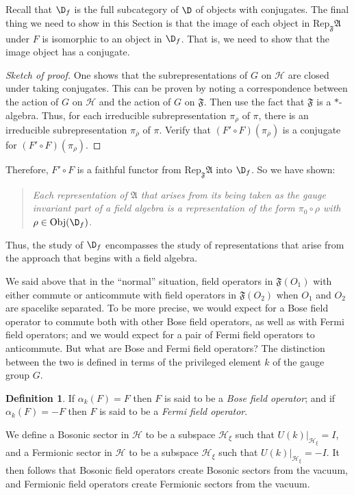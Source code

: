 \documentclass[12pt]{article}
\theoremstyle{definition}
\theoremstyle{definition}
\newtheorem{defn}[thm]{Definition}
\theoremstyle{remark}
\newcommand{\Obj}{\mathrm{Obj}}
\def\2#1{{\mathcal #1}}
\def\ol#1{{\overline #1}}
\def\al#1{{\mathfrak #1}}
\def\a{\alpha} \def\b{\beta} \def\g{\gamma} \def\d{\delta}
\newcommand{\Rep}{\mathrm{Rep}}
\begin{document}
Recall that $\D _f$ is the full subcategory of $\D$ of objects with
conjugates.  The final thing we need to show in this Section is that
the image of each object in $\Rep _{\al F}\al A$ under $F$ is
isomorphic to an object in $\D _f$.  That is, we need to show that the
image object has a conjugate.

\begin{proof}[Sketch of proof] One shows that the subrepresentations
  of $G$ on $\2H$ are closed under taking conjugates.  This can be
  proven by noting a correspondence between the action of $G$ on $\2H$
  and the action of $G$ on $\al F$.  Then use the fact that $\al F$ is
  a $*$-algebra.  Thus, for each irreducible subrepresentation $\pi
  _\rho $ of $\pi$, there is an irreducible subrepresentation $\pi
  _{\ol\rho}$ of $\pi$.  Verify that $(F'\circ F)(\pi _{\ol\rho})$ is
  a conjugate for $(F'\circ F)(\pi _\rho )$. \end{proof}

\noindent Therefore, $F'\circ F$ is a faithful functor
from $\Rep _{\al F}\al A$ into $\D _f$.  So we have
shown:
\begin{quote} \textit{Each representation of $\al A$ that arises from
    its being taken as the gauge invariant part of a field algebra is
    a representation of the form $\pi _0\circ \rho$ with $\rho \in
    \Obj (\D _f)$.}  \end{quote} Thus, the study of $\D _f$
encompasses the study of representations that arise from the approach
that begins with a field algebra.  


We said above that in the ``normal'' situation, field operators in
$\al F(O_1)$ with either commute or anticommute with field operators
in $\al F(O_2)$ when $O_1$ and $O_2$ are spacelike separated.  To be
more precise, we would expect for a Bose field operator to commute
both with other Bose field operators, as well as with Fermi field
operators; and we would expect for a pair of Fermi field operators to
anticommute.  But what are Bose and Fermi field operators?  The
distinction between the two is defined in terms of the privileged
element $k$ of the gauge group $G$.  

\begin{defn} If $\a _k(F)=F$ then $F$ is said to be a \emph{Bose field
    operator}; and if $\a _k(F)=-F$ then $F$ is said to be a
  \emph{Fermi field operator}. \end{defn}

We define a Bosonic sector in $\2H$ to be a subspace $\2H _{\xi}$ such
that $U(k)|_{\2H _{\xi}}=I$, and a Fermionic sector in $\2H$ to be a
subspace $\2H _{\xi}$ such that $U(k)|_{\2H_{\xi}}=-I$.  It then
follows that Bosonic field operators create Bosonic sectors from the
vacuum, and Fermionic field operators create Fermionic sectors from
the vacuum.  
\end{document}
